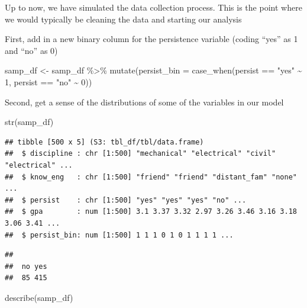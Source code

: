 \documentclass[
]{book}
\newenvironment{Shaded}{\begin{snugshade}}{\end{snugshade}}
\newcommand{\AttributeTok}[1]{\textcolor[rgb]{0.77,0.63,0.00}{#1}}
\newcommand{\DecValTok}[1]{\textcolor[rgb]{0.00,0.00,0.81}{#1}}
\newcommand{\FunctionTok}[1]{\textcolor[rgb]{0.00,0.00,0.00}{#1}}
\newcommand{\NormalTok}[1]{#1}
\newcommand{\OtherTok}[1]{\textcolor[rgb]{0.56,0.35,0.01}{#1}}
\newcommand{\SpecialCharTok}[1]{\textcolor[rgb]{0.00,0.00,0.00}{#1}}
\newcommand{\StringTok}[1]{\textcolor[rgb]{0.31,0.60,0.02}{#1}}
\begin{document}
Up to now, we have simulated the data collection process. This is the point where we would typically be cleaning the data and starting our analysis

First, add in a new binary column for the persistence variable (coding ``yes'' as 1 and ``no'' as 0)

\begin{Shaded}
\begin{Highlighting}[]
\NormalTok{samp\_df }\OtherTok{\textless{}{-}}\NormalTok{ samp\_df }\SpecialCharTok{\%\textgreater{}\%} 
  \FunctionTok{mutate}\NormalTok{(}\AttributeTok{persist\_bin =} \FunctionTok{case\_when}\NormalTok{(persist }\SpecialCharTok{==} \StringTok{"yes"} \SpecialCharTok{\textasciitilde{}} \DecValTok{1}\NormalTok{,}
\NormalTok{                                 persist }\SpecialCharTok{==} \StringTok{"no"} \SpecialCharTok{\textasciitilde{}} \DecValTok{0}\NormalTok{))}
\end{Highlighting}
\end{Shaded}

Second, get a sense of the distributions of some of the variables in our model

\begin{Shaded}
\begin{Highlighting}[]
\FunctionTok{str}\NormalTok{(samp\_df)}
\end{Highlighting}
\end{Shaded}

\begin{verbatim}
## tibble [500 x 5] (S3: tbl_df/tbl/data.frame)
##  $ discipline : chr [1:500] "mechanical" "electrical" "civil" "electrical" ...
##  $ know_eng   : chr [1:500] "friend" "friend" "distant_fam" "none" ...
##  $ persist    : chr [1:500] "yes" "yes" "yes" "no" ...
##  $ gpa        : num [1:500] 3.1 3.37 3.32 2.97 3.26 3.46 3.16 3.18 3.06 3.41 ...
##  $ persist_bin: num [1:500] 1 1 1 0 1 0 1 1 1 1 ...
\end{verbatim}

\begin{Shaded}
\end{Shaded}

\begin{verbatim}
## 
##  no yes 
##  85 415
\end{verbatim}

\begin{Shaded}
\begin{Highlighting}[]
\FunctionTok{describe}\NormalTok{(samp\_df)}
\end{Highlighting}
\end{Shaded}
\end{document}

